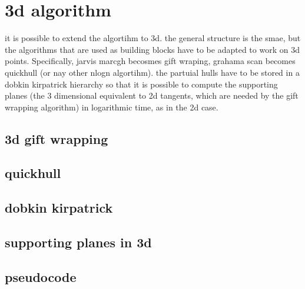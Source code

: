 \documentclass[
12pt,
a4paper,
oneside,
headinclude,
footinclude]{report}
\theoremstyle{definition} %
\begin{document}
\section{3d algorithm}
it is possible to extend the algortihm to 3d. the general structure is the smae, but the algorithms that are used as building blocks have to be adapted to work on 3d points.
Specifically, jarvis marcgh becosmes gift wraping, grahama scan becomes quickhull (or nay other nlogn algortihm). the partuial hulls have to be stored in a dobkin kirpatrick hierarchy so that it is possible to compute the supporting planes (the 3 dimensional equivalent to 2d tangents, which are needed by the gift wrapping algorithm) in logarithmic time, as in the 2d case.

\subsection{3d gift wrapping}

\subsection{quickhull}

\subsection{dobkin kirpatrick}

\subsection{supporting planes in 3d}

\subsection{pseudocode}



\end{document}
